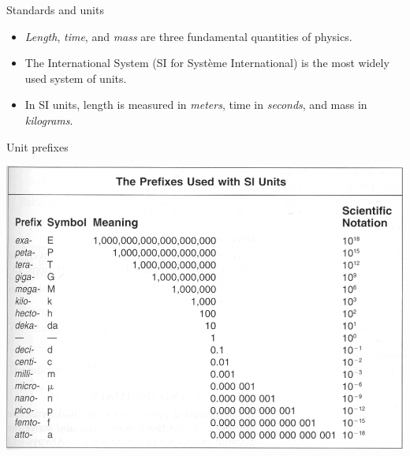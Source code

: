 \documentclass[18pt]{LectMechanics}
\begin{document}




\begin{frame}{Standards and units}{}
	\begin{itemize}
		\item \emph{Length}, \emph{time}, and \emph{mass} are three fundamental
		      quantities of physics.
		\item The International System (SI for Système International) is the most
		      widely used system of units.
		\item In SI units, length is measured in \textit{meters}, time in
		      \textit{seconds}, and mass in \textit{kilograms}.
	\end{itemize}
\end{frame}



\begin{frame}{Unit prefixes}{}
	\begin{center}
		\includegraphics[width=0.8\linewidth]{Unit_prefixes}
	\end{center}

\end{frame}
\end{document}

